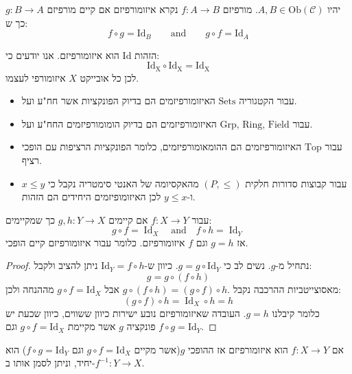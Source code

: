\documentclass{tstextbook}
\begin{document}
\begin{definition}
יהיו \(A,B \in \mathrm{Ob}(\mathcal{C})\). מורפיזם \(f:A\to B\) נקרא איזומורפיזם אם קיים מורפיזם \(g:B\to A\) כך ש:
$$f\circ  g = \mathrm{Id}_{B}\qquad \text{and}\qquad g \circ  f = \mathrm{Id}_{A}$$

\end{definition}
\begin{example}
הזהות \(\mathrm{Id}\) הוא איזומורפיזם. אנו יודעים כי:
$$\mathrm{Id_{X}\circ Id_{X}=Id_{X}}$$
לכן כל אובייקט \(X\) איזומורפי לעצמו.

\end{example}
\begin{example}
  \begin{itemize}
    \item עבור הקטגוריה \(\text{Sets}\) האיזומורפיזמים הם בדיוק הפונקציות אשר חח"ע ועל. 
    \item עבור \(\text{Grp, Ring, Field}\) האיזומורפיזמים הם בדיוק הומומורפיזמים החח"ע ועל.
    \item עבור \(\text{Top}\) האיזומורפיזמים הם ההומאומורפיזמים, כלומר הפונקציות הרציפות עם הופכי רציף.
    \item עבור קבוצות סדורות חלקית \(\left( P,\leq \right)\) מהאקסיומה של האנטי סימטריה נקבל כי \(x\leq y\) ו-\(y\leq x\) לכן האיזומופיזמים היחידים הם הזהות.
  \end{itemize}
\end{example}
\begin{proposition}
עבור \(f:X\to Y\) אם קיימים \(g,h:Y\to X\) כך שמקיימים:
$$g\circ f=\operatorname{Id}_{X}\quad{\mathrm{and}}\quad f\circ h=\operatorname{Id}_{Y}$$
אז \(g=h\) וגם \(f\) איזומורפיזם. כלומר עבור איזומורפיזם קיים הופכי.

\end{proposition}
\begin{proof}
נתחיל מ-\(g\). נשים לב כי \(g=g\circ\mathrm{Id}_{Y}\). כיוון ש-\(\mathrm{Id}_{Y}=f\circ h\) ניתן להציב ולקבל:
$$g=g\circ(f\circ h)$$
מאסוצייטביות ההרכבה נקבל \(g\circ(f\circ h)=(g\circ f)\circ h.\) אבל \(g \circ f = \mathrm{Id}_{X}\) מההנחה ולכן:
$$(g\circ f)\circ h=\operatorname{Id}_{X}\circ h=h$$
כלומר קיבלנו \(g=h\). העובדה שאיזומורפיזם נובע ישירות כיוון ששווים, כיוון שכעת יש פונקציה \(g\) אשר מקיימת \(g\circ f = \mathrm{Id}_{X}\) וגם \(f\circ g = \mathrm{Id}_{Y}\).

\end{proof}
\begin{proposition}
אם \(f:X\to Y\) הוא איזומורפיזם אז ההופכי \(g\)(אשר מקיים \(g\circ f = \mathrm{Id}_{X}\) וגם \(f\circ g=\mathrm{Id}_{Y}\)) הוא יחיד, וניתן לסמן אותו ב-\(f^{-1}:Y\to X\).

\end{proposition}
\end{document}
